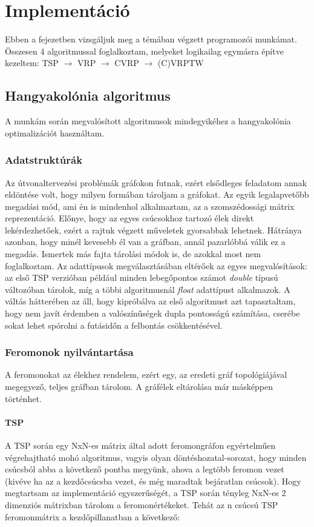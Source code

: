 \chapter{Implementáció} \label{implementationChapter}

Ebben a fejezetben vizsgáljuk meg a témában végzett programozói munkámat. Összesen 4 algoritmussal foglalkoztam, melyeket logikailag egymásra építve kezeltem:
TSP  \(\rightarrow\) VRP \(\rightarrow\) CVRP \(\rightarrow\) (C)VRPTW

\section{Hangyakolónia algoritmus}
A munkám során megvalósított algoritmusok mindegyikéhez a hangyakolónia optimalizációt használtam.

\subsection{Adatstruktúrák}
Az útvonaltervezési problémák gráfokon futnak, ezért elsődleges feladatom annak eldöntése volt, hogy milyen formában tároljam a gráfokat. Az egyik legalapvetőbb megadási mód, ami én is mindenhol alkalmaztam, az a szomszédossági mátrix reprezentáció. Előnye, hogy az egyes csúcsokhoz tartozó élek direkt lekérdezhetőek, ezért a rajtuk végzett műveletek gyorsabbak lehetnek. Hátránya azonban, hogy minél kevesebb él van a gráfban, annál pazarlóbbá válik ez a megadás. Ismertek más fajta tárolási módok is, de azokkal most nem foglalkoztam. \cite{alg_optim}
Az adattípusok megválasztásában eltérőek az egyes megvalósítások: az első TSP verzióban például minden lebegőpontos számot \textit{double} típusú változóban tárolok, míg a többi algoritmusnál \textit{float} adattípust alkalmazok. A váltás hátterében az áll, hogy kipróbálva az első algoritmust azt tapasztaltam, hogy nem javít érdemben a valószínűségek dupla pontosságú számítása, cserébe sokat lehet spórolni a futásidőn a felbontás csökkentésével.


\subsection{Feromonok nyilvántartása}
A feromonokat az élekhez rendelem, ezért egy, az eredeti gráf topológiájával megegyező, teljes gráfban tárolom. A gráfélek eltárolása már másképpen történhet. 

\subsubsection{TSP}
A TSP során egy NxN-es mátrix által adott feromongráfon egyértelműen végrehajtható mohó algoritmus, vagyis olyan döntéshozatal-sorozat, hogy minden csúcsból abba a következő pontba megyünk, ahova a legtöbb feromon vezet (kivéve ha az a kezdőcsúcsba vezet, és még maradtak bejáratlan csúcsok). Hogy megtartsam az implementáció egyszerűségét, a TSP során tényleg NxN-es 2 dimenziós mátrixban tárolom a feromonértékeket. Tehát az n csúcsú TSP feromonmátrix a kezdőpillanatban a következő:

